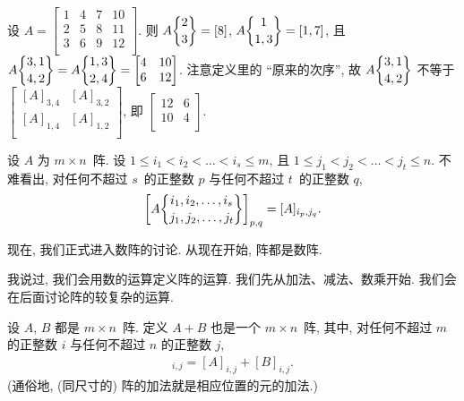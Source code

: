 \documentclass[../libro.tex]{subfiles}
\begin{document}
\begin{example}
    设
    \(
        A =
        \begin{bmatrix}
            1 & 4 & 7 & 10 \\
            2 & 5 & 8 & 11 \\
            3 & 6 & 9 & 12 \\
        \end{bmatrix}.
    \)
    则
    \(
        A\submat{2}{3} =
        [8]
    \),
    \(
        A\submat{1}{1,3} =
        [1, 7]
    \),
    且
    \(
        A\submat{3,1}{4,2} =
        A\submat{1,3}{2,4} =
        \begin{bmatrix}
            4 & 10 \\
            6 & 12 \\
        \end{bmatrix}
    \).
    注意定义里的 ``原来的次序'',
    故
    \(
        A\submat{3,1}{4,2}
    \)
    不等于
    \(
        \begin{bmatrix}
            [A]_{3,4} & [A]_{3,2} \\
            [A]_{1,4} & [A]_{1,2} \\
        \end{bmatrix}
    \),
    即
    \(
        \begin{bmatrix}
            12 & 6 \\
            10 & 4 \\
        \end{bmatrix}
    \).
\end{example}

设 \(A\) 为 \(m \times n\)~阵.
设
\(1 \leq i_1 < i_2 < \dots < i_s \leq m\),
且
\(1 \leq j_1 < j_2 < \dots < j_t \leq n\).
不难看出,
对任何不超过 \(s\)~的正整数 \(p\)
与任何不超过 \(t\)~的正整数 \(q\),
\begin{align*}
    \left[
        A\submat{i_1, i_2, \dots, i_s}{j_1, j_2, \dots, j_t}
    \right]_{p,q}
    = [A]_{i_p, j_q}.
\end{align*}

\vspace{2ex}

现在, 我们正式进入数阵的讨论.
从现在开始, 阵都是数阵.

我说过, 我们会用数的运算定义阵的运算.
我们先从加法、减法、数乘开始.
我们会在后面讨论阵的较复杂的运算.

\begin{definition}[阵的加法]
    设 \(A\), \(B\) 都是 \(m \times n\)~阵.
    定义 \(A + B\) 也是一个 \(m \times n\)~阵,
    其中, 对任何不超过 \(m\) 的正整数 \(i\)
    与任何不超过 \(n\) 的正整数 \(j\),
    \begin{align*}
        [A + B]_{i,j} = [A]_{i,j} + [B]_{i,j}.
    \end{align*}
    (通俗地, (同尺寸的) 阵的加法就是相应位置的元的加法.)
\end{definition}
\end{document}
